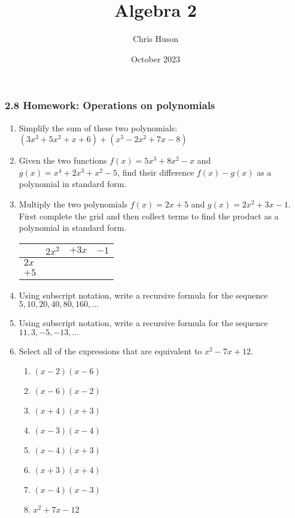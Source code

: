 \documentclass[12pt, twoside]{article}
\title{Algebra 2}
\author{Chris Huson}
\date{October 2023}
\begin{document}
\subsubsection*{2.8 Homework: Operations on polynomials}
\begin{enumerate}

\item Simplify the sum of these two polynomials: $(3x^3+5x^2+x+6)+(x^3-2x^2+7x-8)$ \vspace{2cm}

\item Given the two functions $f(x)=5x^3+8x^2-x$ and $g(x)=x^4+2x^3+x^2-5$, find their difference $f(x)-g(x)$ as a polynomial in standard form. \vspace{3cm}

\item Multiply the two polynomials $f(x)=2x+5$ and $g(x)=2x^2+3x-1$. First complete the grid and then collect terms to find the product as a polynomial in standard form. \\[0.25cm]
\begin{tabular}{|p{1cm}|p{3cm}|p{3cm}|p{3cm}|}
    \hline
     & $2x^2$ & $+3x$ & $-1$ \\
    \hline
    $2x$ &  & & \\[0.5cm]
    \hline
    $+5$ &  & & \\[0.5cm]
    \hline
\end{tabular} \vspace{4cm}

\item Using subscript notation, write a recursive formula for the sequence $5, 10, 20, 40, 80, 160, \dots$ \vspace{2cm}

\item Using subscript notation, write a recursive formula for the sequence $11, 3, -5, -13, \dots$ 

\newpage
\item Select all of the expressions that are equivalent to $x^2-7x+12$.
    \begin{multicols}{2}
    \begin{enumerate}
        \item $(x-2)(x-6)$
        \item $(x-6)(x-2)$ 
        \item $(x+4)(x+3)$ 
        \item $(x-3)(x-4)$ 
        \item $(x-4)(x+3)$
        \item $(x+3)(x+4)$ 
        \item $(x-4)(x-3)$
        \item $x^2+7x-12$
    \end{enumerate} 
    \end{multicols}
    \vspace{0.25cm}


\end{enumerate}
\end{document}
